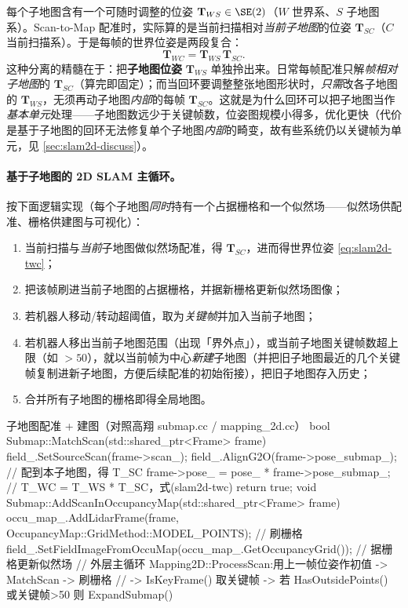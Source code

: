 每个子地图含有一个可随时调整的位姿 $\mathbf{T}_{WS}\in\SE(2)$（$W$ 世界系、$S$ 子地图系）。Scan-to-Map 配准时，实际算的是当前扫描相对\emph{当前子地图}的位姿 $\mathbf{T}_{SC}$（$C$ 当前扫描系）。于是每帧的世界位姿是两段复合：
\begin{equation}
\mathbf{T}_{WC}=\mathbf{T}_{WS}\,\mathbf{T}_{SC}.
\label{eq:slam2d-twc}
\end{equation}
这种分离的精髓在于：把\textbf{子地图位姿} $\mathbf{T}_{WS}$ 单独拎出来。日常每帧配准只解\emph{帧相对子地图}的 $\mathbf{T}_{SC}$（算完即固定）；而当回环要调整整张地图形状时，\emph{只需}改各子地图的 $\mathbf{T}_{WS}$，无须再动子地图\emph{内部}的每帧 $\mathbf{T}_{SC}$。这就是为什么回环可以把子地图当作\emph{基本单元}处理——子地图数远少于关键帧数，位姿图规模小得多，优化更快（代价是基于子地图的回环无法修复单个子地图\emph{内部}的畸变，故有些系统仍以关键帧为单元，见 \cref{sec:slam2d-discuss}）。

\paragraph{基于子地图的 2D SLAM 主循环。}
按下面逻辑实现（每个子地图\emph{同时}持有一个占据栅格和一个似然场——似然场供配准、栅格供建图与可视化）：
\begin{enumerate}
  \item 当前扫描与\emph{当前}子地图做似然场配准，得 $\mathbf{T}_{SC}$，进而得世界位姿 \cref{eq:slam2d-twc}；
  \item 把该帧刷进当前子地图的占据栅格，并据新栅格更新似然场图像；
  \item 若机器人移动/转动超阈值，取为\emph{关键帧}并加入当前子地图；
  \item 若机器人移出当前子地图范围（出现「界外点」），或当前子地图关键帧数超上限（如 $>50$），就以当前帧为中心\emph{新建}子地图（并把旧子地图最近的几个关键帧复制进新子地图，方便后续配准的初始衔接），把旧子地图存入历史；
  \item 合并所有子地图的栅格即得全局地图。
\end{enumerate}

\begin{codebox}[C++]{子地图配准 + 建图（对照高翔 submap.cc / mapping\_2d.cc）}
bool Submap::MatchScan(std::shared_ptr<Frame> frame) {
  field_.SetSourceScan(frame->scan_);
  field_.AlignG2O(frame->pose_submap_);                 // 配到本子地图，得 T_SC
  frame->pose_ = pose_ * frame->pose_submap_;            // T_WC = T_WS * T_SC，式(slam2d-twc)
  return true;
}
void Submap::AddScanInOccupancyMap(std::shared_ptr<Frame> frame) {
  occu_map_.AddLidarFrame(frame, OccupancyMap::GridMethod::MODEL_POINTS); // 刷栅格
  field_.SetFieldImageFromOccuMap(occu_map_.GetOccupancyGrid());          // 据栅格更新似然场
}
// 外层主循环 Mapping2D::ProcessScan:用上一帧位姿作初值 -> MatchScan -> 刷栅格
//   -> IsKeyFrame() 取关键帧 -> 若 HasOutsidePoints() 或关键帧>50 则 ExpandSubmap()
\end{codebox}

